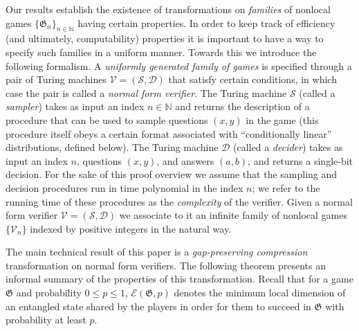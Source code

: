 \documentclass[11pt]{article}
\theoremstyle{definition}
\newcommand{\N}{\ensuremath{\mathbb{N}}}
\newcommand{\game}{\mathfrak{G}}
\newcommand{\sampler}{\mathcal{S}}
\newcommand{\decider}{\mathcal{D}}
\newcommand{\verifier}{\mathcal{V}}
\newcommand{\Ent}{\mathscr{E}}
\begin{document}
Our results establish the existence of transformations on \emph{families} of nonlocal games $\{\game_n\}_{n\in \N}$ having certain properties. In order to keep track of efficiency (and ultimately, computability) properties it is important to have a way to specify such families in a {uniform} manner. Towards this we introduce the following formalism. A \emph{uniformly generated family of games} is specified through a pair of Turing machines $\verifier = (\sampler,\decider)$ that satisfy certain conditions, in which case the pair is called a \emph{normal form verifier}. The Turing machine $\sampler$ (called a \emph{sampler}) takes as input an index $n \in \N$ and returns the description of a procedure that can be used to sample questions $(x,y)$ in the game (this procedure itself obeys a certain format associated with ``conditionally linear'' distributions, defined below). The Turing machine $\decider$ (called a \emph{decider}) takes as input an index $n$, questions $(x,y)$, and answers $(a,b)$, and returns a single-bit decision. For the sake of this proof overview we assume that the sampling and decision procedures run in time polynomial in the index $n$; we refer to the running time of these procedures as the \emph{complexity} of the verifier. 
	Given a normal form verifier $\verifier= (\sampler,\decider)$ we associate to it an infinite family of nonlocal games $\{\verifier_n \}$ indexed by positive integers in the natural way.  
	


The main technical result of this paper is a \emph{gap-preserving compression} transformation on normal form verifiers. The following theorem presents an informal summary of the properties of this transformation. Recall that for a  game $\game$ and probability $0\leq p \leq 1$, $\Ent(\game,p)$ denotes the minimum local dimension of an entangled state shared by the players in order for them to succeed in $\game$ with probability at least $p$.
\end{document}
